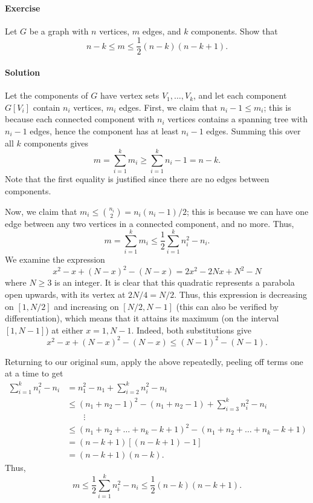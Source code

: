 \documentclass[10pt]{article}
\newcounter{prob}
\newcommand{\problem}{\stepcounter{prob}\paragraph{Exercise \arabic{prob}}}
\newcommand{\solution}{\paragraph{Solution}}
\begin{document}
    \problem Let $G$ be a graph with $n$ vertices, $m$ edges, and $k$ components.
    Show that \[
        n - k \leq m \leq \frac{1}{2}(n - k)(n - k + 1).
    \] 

    \solution Let the components of $G$ have vertex sets $V_1, \dots, V_k$, and let
    each component $G[V_i]$ contain $n_i$ vertices, $m_i$ edges. First, we claim that
    $n_i - 1 \leq m_i$; this is because each connected component with $n_i$ vertices
    contains a spanning tree with $n_i - 1$ edges, hence the component has at least
    $n_i - 1$ edges. Summing this over all $k$ components gives \[
        m = \sum_{i = 1}^k m_i \geq \sum_{i = 1}^k n_i - 1 = n - k.
    \] Note that the first equality is justified since there are no edges between
    components.

    Now, we claim that $m_i \leq \binom{n_i}{2} = n_i(n_i - 1) / 2$; this is because
    we can have one edge between any two vertices in a connected component, and no
    more. Thus, \[
        m = \sum_{i = 1}^k m_i \leq \frac{1}{2}\sum_{i = 1}^k n_i^2 - n_i.
    \] We examine the expression \[
        x^2 - x + (N - x)^2 - (N - x) = 2x^2 - 2Nx + N^2 - N
    \] where $N \geq 3$ is an integer. It is clear that this quadratic represents a
    parabola open upwards, with its vertex at $2N / 4 = N / 2$. Thus, this expression
    is decreasing on $[1, N/ 2]$ and increasing on $[N / 2, N - 1]$ (this can also be
    verified by differentiation), which means that it attains its maximum (on the
    interval $[1, N - 1]$) at either $x = 1, N - 1$. Indeed, both substitutions give
    \[
        x^2 - x + (N - x)^2 - (N - x) \leq (N - 1)^2 - (N - 1).
    \] 

    Returning to our original sum, apply the above repeatedly, peeling off terms one
    at a time to get \begin{align*}
        \sum_{i = 1}^k n_i^2 - n_i 
        &= n_1^2 - n_1 + \sum_{i = 2}^k n_i^2 - n_i \\
        &\leq (n_1 + n_2 - 1)^2 - (n_1 + n_2 - 1) + \sum_{i = 3}^k n_i^2 - n_i \\
        &\qquad \vdots \\
        &\leq (n_1 + n_2 + \dots + n_k - k + 1)^2 - (n_1 + n_2 + \dots + n_k - k +
        1) \\
        &= (n - k + 1)[(n - k + 1) - 1] \\
        &= (n - k + 1)(n - k).
    \end{align*}
    Thus, \[
        m \leq \frac{1}{2}\sum_{i = 1}^k n_i^2 - n_i \leq \frac{1}{2}(n - k)(n - k +
        1).
    \] 
\end{document}
